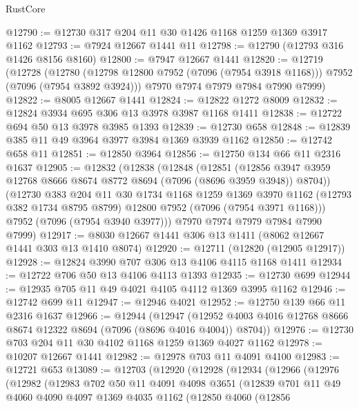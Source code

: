 \begin{lexlean}{RustCore}
\begin{coremodule}
@12790 := @12730 @317 @204 @11 @30 @1426 @1168 @1259 @1369 @3917 @1162
@12793 := @7924 @12667 @1441 @11
@12798 := @12790 (@12793 @316 @1426 @8156 @8160)
@12800 := @7947 @12667 @1441
@12820 := @12719
    (@12728
      (@12780 (@12798 @12800 @7952 (@7096 (@7954 @3918 @1168))) @7952 (@7096 (@7954 @3892 @3924)))
      @7970
      @7974
      @7979
      @7984
      @7990
      @7999)
@12822 := @8005 @12667 @1441
@12824 := @12822 @1272 @8009
@12832 := @12824 @3934 @695 @306 @13 @3978 @3987 @1168 @1411
@12838 := @12722 @694 @50 @13 @3978 @3985 @1393
@12839 := @12730 @658
@12848 := @12839 @385 @11 @49 @3964 @3977 @3984 @1369 @3939 @1162
@12850 := @12742 @658 @11
@12851 := @12850 @3964
@12856 := @12750 @134 @66 @11 @2316 @1637
@12905 := @12832
    (@12838
      (@12848
        (@12851
          (@12856 @3947 @3959 @12768 @8666 @8674 @8772 @8694 (@7096 (@8696 @3959 @3948)) @8704))
        (@12730
          @383
          @204
          @11
          @30
          @1734
          @1168
          @1259
          @1369
          @3970
          @1162
          (@12793 @382 @1734 @8795 @8799)
          @12800
          @7952
          (@7096 (@7954 @3971 @1168)))
        @7952
        (@7096 (@7954 @3940 @3977)))
      @7970
      @7974
      @7979
      @7984
      @7990
      @7999)
@12917 := @8030 @12667 @1441 @306 @13 @1411 (@8062 @12667 @1441 @303 @13 @1410 @8074)
@12920 := @12711 (@12820 (@12905 @12917))
@12928 := @12824 @3990 @707 @306 @13 @4106 @4115 @1168 @1411
@12934 := @12722 @706 @50 @13 @4106 @4113 @1393
@12935 := @12730 @699
@12944 := @12935 @705 @11 @49 @4021 @4105 @4112 @1369 @3995 @1162
@12946 := @12742 @699 @11
@12947 := @12946 @4021
@12952 := @12750 @139 @66 @11 @2316 @1637
@12966 := @12944
    (@12947 (@12952 @4003 @4016 @12768 @8666 @8674 @12322 @8694 (@7096 (@8696 @4016 @4004)) @8704))
@12976 := @12730 @703 @204 @11 @30 @4102 @1168 @1259 @1369 @4027 @1162
@12978 := @10207 @12667 @1441
@12982 := @12978 @703 @11 @4091 @4100
@12983 := @12721 @653
@13089 := @12703
    (@12920
      (@12928
        (@12934
          (@12966
            (@12976
              (@12982
                (@12983
                  @702
                  @50
                  @11
                  @4091
                  @4098
                  @3651
                  (@12839
                    @701
                    @11
                    @49
                    @4060
                    @4090
                    @4097
                    @1369
                    @4035
                    @1162
                    (@12850
                      @4060
                      (@12856

\end{coremodule}
\end{lexlean}
